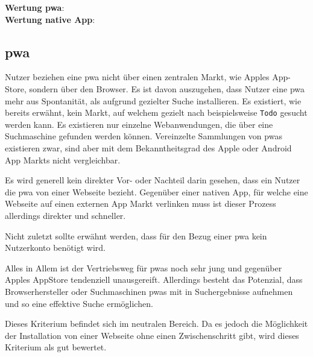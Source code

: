 \textbf{Wertung \ac{pwa}}:  \Circle \\
\textbf{Wertung native App}:  \\



\subsection{\ac{pwa}}
Nutzer beziehen eine \ac{pwa} nicht über einen zentralen Markt, wie Apples App-Store, sondern über den Browser. Es ist davon auszugehen, dass Nutzer eine \ac{pwa} mehr aus Spontanität, als aufgrund gezielter Suche installieren. Es existiert, wie bereits erwähnt, kein Markt, auf welchem gezielt nach beispielsweise \texttt{Todo} gesucht werden kann. Es existieren nur einzelne Webanwendungen, die über eine Suchmaschine gefunden werden können. Vereinzelte Sammlungen von \ac{pwa}s existieren zwar, sind aber mit dem Bekanntheitsgrad des Apple oder Android App Markts nicht vergleichbar.

Es wird generell kein direkter Vor- oder Nachteil darin gesehen, dass ein Nutzer die \ac{pwa} von einer Webseite bezieht. Gegenüber einer nativen App, für welche eine Webseite auf einen externen App Markt verlinken muss ist dieser Prozess allerdings direkter und schneller.

Nicht zuletzt sollte erwähnt werden, dass für den Bezug einer \ac{pwa} kein Nutzerkonto benötigt wird.

Alles in Allem ist der Vertriebsweg für \ac{pwa}s noch sehr jung und gegenüber Apples AppStore tendenziell unausgereift. Allerdings besteht das Potenzial, dass Browserhersteller oder Suchmaschinen \ac{pwa}s mit in Suchergebnisse aufnehmen und so eine effektive Suche ermöglichen.

Dieses Kriterium befindet sich im neutralen Bereich. Da es jedoch die Möglichkeit der Installation von einer Webseite ohne einen Zwischenschritt gibt, wird dieses Kriterium als gut bewertet.